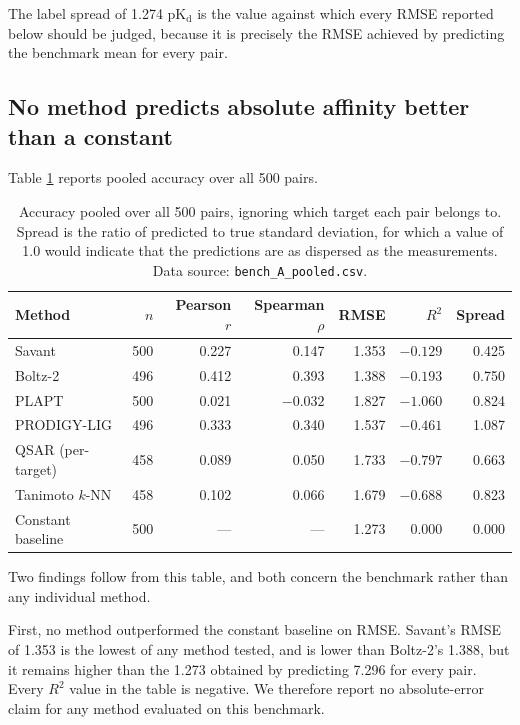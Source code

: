 \documentclass[11pt]{article}
\newcommand{\pkd}{\ensuremath{\mathrm{pK_d}}}
\begin{document}
The label spread of 1.274 \pkd{} is the value against which every RMSE reported
below should be judged, because it is precisely the RMSE achieved by predicting
the benchmark mean for every pair.

\subsection{No method predicts absolute affinity better than a constant}
\label{sec:pooled}

Table \ref{tab:pooled} reports pooled accuracy over all 500 pairs.

\begin{table}[H]
\centering
\caption{Accuracy pooled over all 500 pairs, ignoring which target each pair
belongs to. Spread is the ratio of predicted to true standard deviation, for
which a value of 1.0 would indicate that the predictions are as dispersed as
the measurements. Data source: \texttt{bench\_A\_pooled.csv}.}
\label{tab:pooled}
\begin{tabular}{lrrrrrr}
\toprule
Method & $n$ & Pearson $r$ & Spearman $\rho$ & RMSE & $R^2$ & Spread \\
\midrule
Savant             & 500 & 0.227 & 0.147 & 1.353 & $-0.129$ & 0.425 \\
Boltz-2            & 496 & 0.412 & 0.393 & 1.388 & $-0.193$ & 0.750 \\
PLAPT              & 500 & 0.021 & $-0.032$ & 1.827 & $-1.060$ & 0.824 \\
PRODIGY-LIG        & 496 & 0.333 & 0.340 & 1.537 & $-0.461$ & 1.087 \\
QSAR (per-target)  & 458 & 0.089 & 0.050 & 1.733 & $-0.797$ & 0.663 \\
Tanimoto $k$-NN    & 458 & 0.102 & 0.066 & 1.679 & $-0.688$ & 0.823 \\
\midrule
Constant baseline  & 500 & ---   & ---   & 1.273 & 0.000 & 0.000 \\
\bottomrule
\end{tabular}
\end{table}

Two findings follow from this table, and both concern the benchmark rather than
any individual method.

First, no method outperformed the constant baseline on RMSE. Savant's RMSE of
1.353 is the lowest of any method tested, and is lower than Boltz-2's 1.388,
but it remains higher than the 1.273 obtained by predicting 7.296 for every
pair. Every $R^2$ value in the table is negative. We therefore report no
absolute-error claim for any method evaluated on this benchmark.
\end{document}
